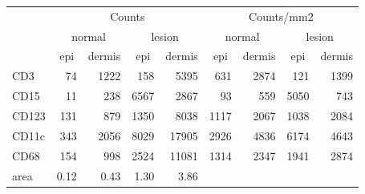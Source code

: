\begin{tabular}{lrrrr|rrrr}
   \hline
 
             \multicolumn{1}{c}{} & \multicolumn{4}{c|}{Counts} & \multicolumn{4}{c}{Counts/mm2} \\ 
             \multicolumn{1}{c}{} & \multicolumn{2}{c}{normal} & \multicolumn{2}{c|}{lesion} & \multicolumn{2}{c}{normal} & \multicolumn{2}{c}{lesion}  \\ 
             \multicolumn{1}{c}{} & \multicolumn{1}{c}{epi} & dermis & \multicolumn{1}{c}{epi} & \multicolumn{1}{c|}{dermis} & \multicolumn{1}{c}{epi} & dermis & \multicolumn{1}{c}{epi} & dermis  \\ 
             \hline
        CD3 & 74 & 1222 & 158 & 5395 & 631 & 2874 & 121 & 1399 \\ 
  CD15 & 11 & 238 & 6567 & 2867 & 93 & 559 & 5050 & 743 \\ 
  CD123 & 131 & 879 & 1350 & 8038 & 1117 & 2067 & 1038 & 2084 \\ 
  CD11c & 343 & 2056 & 8029 & 17905 & 2926 & 4836 & 6174 & 4643 \\ 
  CD68 & 154 & 998 & 2524 & 11081 & 1314 & 2347 & 1941 & 2874 \\ 
  area & 0.12 & 0.43 & 1.30 & 3.86 &    &    &    &    \\ 
   \hline
\end{tabular}
